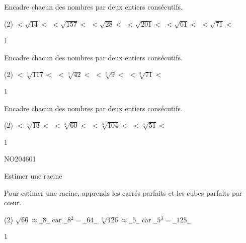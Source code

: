 \documentclass[a4paper,11pt]{report}
\begin{document}
\begin{exop}{
    Encadre chacun des nombres par deux entiers consécutifs.
    \begin{tasks}(2)
    \task \hrulefill $< \sqrt{14} <$ \hrulefill
    \task \hrulefill $< \sqrt{157} <$ \hrulefill
    \task \hrulefill $< \sqrt{28} <$ \hrulefill
    \task \hrulefill $< \sqrt{201} <$ \hrulefill
    \task \hrulefill $< \sqrt{61} <$ \hrulefill
    \task \hrulefill $< \sqrt{71} <$ \hrulefill
    \end{tasks}
}{1}    
\end{exop}


\begin{exop}{
    Encadre chacun des nombres par deux entiers consécutifs.
    \begin{tasks}(2)
    \task \hrulefill $< \sqrt[3]{117} <$ \hrulefill
    \task \hrulefill $< \sqrt[3]{42} <$ \hrulefill
    \task \hrulefill $< \sqrt[3]{9} <$ \hrulefill
    \task \hrulefill $< \sqrt[3]{71} <$ \hrulefill
    \end{tasks}
}{1}    
\end{exop}

\begin{exop}{
    Encadre chacun des nombres par deux entiers consécutifs.
    \begin{tasks}(2)
    \task \hrulefill $< \sqrt[3]{13} <$ \hrulefill
    \task \hrulefill $< \sqrt[3]{60} <$ \hrulefill
    \task \hrulefill $< \sqrt[3]{104} <$ \hrulefill
    \task \hrulefill $< \sqrt[3]{51} <$ \hrulefill
    \end{tasks}
}{1}    
\end{exop}




\begin{exof}{NO204}{60}{1} %
\end{exof}





\begin{resolu}{Estimer une racine}{
Pour estimer une racine, apprends les carrés parfaits et les cubes parfaits par cœur.
\begin{tasks}(2)
    \task $\sqrt{66}\approx$\underline{~$8$~} car \underline{~$8$}$^2=$\underline{~$64$~}
    \task $\sqrt[3]{126}\approx$\underline{~$5$~} car \underline{~$5$}$^3=$\underline{~$125$~}
\end{tasks}
}{1}    
\end{resolu}
\end{document}
